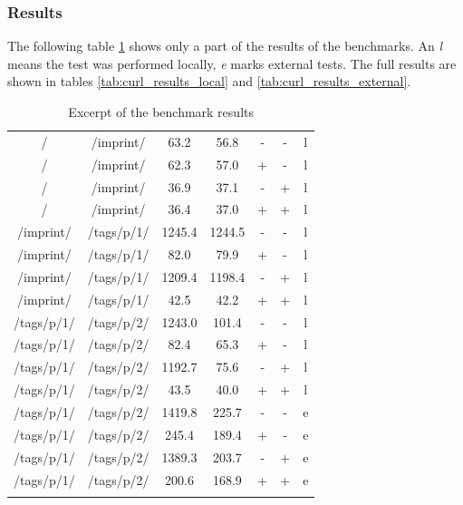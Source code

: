 \subsubsection{Results\label{curl:results}}

The following table \ref{tab:short_curl} shows only a part of the results of the \curl{} benchmarks.
An \emph{l} means the test was performed locally, \emph{e} marks external tests.
The full results are shown in tables \ref{tab:curl_results_local} and \ref{tab:curl_results_external}.
\newpage{}
\begin{center}
\footnotesize
\begin{longtable}{ccccccc}
    \caption{Excerpt of the \curl{} benchmark results}
    \\
	\hline
	\thead{From} & \thead{To} & \thead{Common} & \thead{\lare{}} & \thead{DC} & \thead{TC} & \thead{} \\
\hline
/ & /imprint/ & 63.2 & 56.8 & - & - & l \\
/ & /imprint/ & 62.3 & 57.0 & + & - & l \\
/ & /imprint/ & 36.9 & 37.1 & - & + & l \\
/ & /imprint/ & 36.4 & 37.0 & + & + & l \\
\hline
/imprint/ & /tags/p/1/ & 1245.4 & 1244.5 & - & - & l \\
/imprint/ & /tags/p/1/ & 82.0 & 79.9 & + & - & l \\
/imprint/ & /tags/p/1/ & 1209.4 & 1198.4 & - & + & l \\
/imprint/ & /tags/p/1/ & 42.5 & 42.2 & + & + & l \\
\hline
/tags/p/1/ & /tags/p/2/ & 1243.0 & 101.4 & - & - & l \\
/tags/p/1/ & /tags/p/2/ & 82.4 & 65.3 & + & - & l \\
/tags/p/1/ & /tags/p/2/ & 1192.7 & 75.6 & - & + & l \\
/tags/p/1/ & /tags/p/2/ & 43.5 & 40.0 & + & + & l \\
\hline
/tags/p/1/ & /tags/p/2/ & 1419.8 & 225.7 & - & - & e \\
/tags/p/1/ & /tags/p/2/ & 245.4 & 189.4 & + & - & e \\
/tags/p/1/ & /tags/p/2/ & 1389.3 & 203.7 & - & + & e \\
/tags/p/1/ & /tags/p/2/ & 200.6 & 168.9 & + & + & e \\
\hline
\label{tab:short_curl}
\end{longtable}
\end{center}

